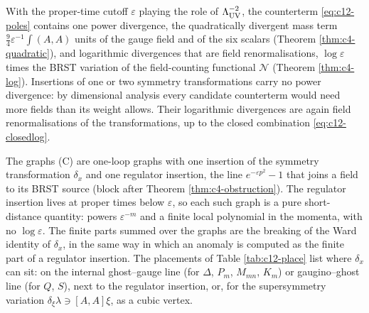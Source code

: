 \begin{remark}
With the proper-time cutoff $\varepsilon$ playing the role of $\Lambda_{\rm UV}^{-2}$, the counterterm \eqref{eq:c12-poles} contains one power divergence, the quadratically divergent mass term $\tfrac94\varepsilon^{-1}\int(A,A)$ units of the gauge field and of the six scalars (Theorem \ref{thm:c4-quadratic}), and logarithmic divergences that are field renormalisations, $\log\varepsilon$ times the BRST variation of the field-counting functional $\mathcal N$ (Theorem \ref{thm:c4-log}). Insertions of one or two symmetry transformations carry no power divergence: by dimensional analysis every candidate counterterm would need more fields than its weight allows. Their logarithmic divergences are again field renormalisations of the transformations, up to the closed combination \eqref{eq:c12-closedlog}.
\end{remark}

\begin{remark}
The graphs (C) are one-loop graphs with one insertion of the symmetry transformation $\delta_x$ and one regulator insertion, the line $e^{-\varepsilon p^2}-1$ that joins a field to its BRST source (block after Theorem \ref{thm:c4-obstruction}). The regulator insertion lives at proper times below $\varepsilon$, so each such graph is a pure short-distance quantity: powers $\varepsilon^{-m}$ and a finite local polynomial in the momenta, with no $\log\varepsilon$. The finite parts summed over the graphs are the breaking of the Ward identity of $\delta_x$, in the same way in which an anomaly is computed as the finite part of a regulator insertion. The placements of Table \ref{tab:c12-place} list where $\delta_x$ can sit: on the internal ghost--gauge line (for $\Delta$, $P_m$, $M_{mn}$, $K_m$) or gaugino--ghost line (for $Q$, $S$), next to the regulator insertion, or, for the supersymmetry variation $\delta_\xi\lambda\ni[A,A]\xi$, as a cubic vertex.
\end{remark}

